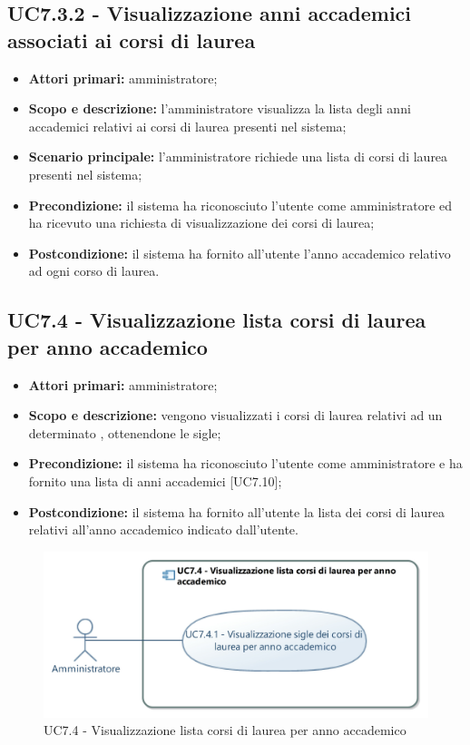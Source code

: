 \documentclass[AnalisiDeiRequisiti.tex]{subfiles}
\begin{document}
\subsection{UC7.3.2 - Visualizzazione anni accademici associati ai corsi di laurea}
\begin{itemize}
	\item \textbf{Attori primari:} amministratore;
	\item \textbf{Scopo e descrizione:} l'amministratore visualizza la lista degli anni accademici relativi ai corsi di laurea presenti nel sistema;
	\item \textbf{Scenario principale:} l'amministratore richiede una lista di corsi di laurea presenti nel sistema;
	\item \textbf{Precondizione:} il sistema ha riconosciuto l'utente come amministratore ed ha ricevuto una richiesta di visualizzazione dei corsi di laurea; 
	\item \textbf{Postcondizione:} il sistema ha fornito all'utente l'anno accademico relativo ad ogni corso di laurea.
\end{itemize}
\subsection{UC7.4 - Visualizzazione lista corsi di laurea per anno accademico}
\begin{itemize}
	\item \textbf{Attori primari:} amministratore;
	\item \textbf{Scopo e descrizione:} vengono visualizzati i corsi di laurea relativi ad un determinato , ottenendone le sigle;
	\item \textbf{Precondizione:} il sistema ha riconosciuto l'utente come amministratore e ha fornito una lista di anni accademici [UC7.10];
	\item \textbf{Postcondizione:} il sistema ha fornito all'utente la lista dei corsi di laurea relativi all'anno accademico indicato dall'utente.
\end{itemize}
\begin{figure}[H]
	\centering
	\includegraphics[width=0.7\linewidth]{UC7_4.jpg}
	\caption{UC7.4 - Visualizzazione lista corsi di laurea per anno accademico}
	\label{fig:UC7.4 - Visualizzazione lista corsi di laurea per anno accademico}
\end{figure}
\end{document}
